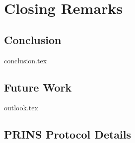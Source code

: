 \documentclass[a4paper,12pt,twoside]{report}
\begin{document}
\clearpage

\chapter{Closing Remarks}
\label{chap:closing}

\section{Conclusion}
\label{sec:conclusion}
{conclusion.tex}

\section{Future Work}
\label{sec:outlook}
{outlook.tex}

\clearpage

\printbibliography[title={Literature},heading=bibintoc,nottype=online]

\printbibliography[title={Online Sources},heading=bibintoc,type=online]

\clearpage

\begin{appendices}

\renewcommand\thefigure{\thechapter.\arabic{figure}}

\chapter{PRINS Protocol Details}



\end{appendices}
\end{document}
